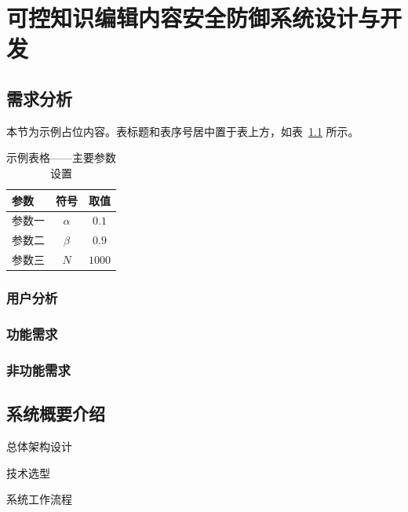 \chapter{可控知识编辑内容安全防御系统设计与开发}\label{chap:experiment}

\section{需求分析}
本节为示例占位内容。表标题和表序号居中置于表上方，如表~\ref{tab:params} 所示。

\begin{table}[htbp]
  \centering
  \caption{示例表格——主要参数设置}
  \label{tab:params}
  \begin{tabular}{lcc}
    \toprule
    参数 & 符号 & 取值 \\
    \midrule
    参数一 & $\alpha$ & $0.1$ \\
    参数二 & $\beta$  & $0.9$ \\
    参数三 & $N$      & $1000$ \\
    \bottomrule
  \end{tabular}
\end{table}

\subsection{用户分析}

\subsection{功能需求}

\subsection{非功能需求}

\section{系统概要介绍}

总体架构设计

技术选型

系统工作流程

